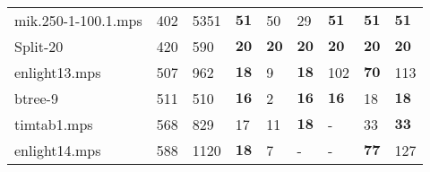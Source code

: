 \documentclass{article}
\begin{document}
\begin{longtable}{|l |l |l |l |l |l |l |l |l |}
mik.250-1-100.1.mps&402&5351&$\mathbf{51}$&50&29&$\mathbf{51}$&$\mathbf{51}$&$\mathbf{51}$\\
Split-20&420&590&$\mathbf{20}$&$\mathbf{20}$&$\mathbf{20}$&$\mathbf{20}$&$\mathbf{20}$&$\mathbf{20}$\\
enlight13.mps&507&962&$\mathbf{18}$&9&$\mathbf{18}$&102&$\mathbf{70}$&113\\
btree-9&511&510&$\mathbf{16}$&2&$\mathbf{16}$&$\mathbf{16}$&18&$\mathbf{18}$\\
timtab1.mps&568&829&17&11&$\mathbf{18}$&-&33&$\mathbf{33}$\\
enlight14.mps&588&1120&$\mathbf{18}$&7&-&-&$\mathbf{77}$&127\\
\hline
\end{longtable}
\end{document}
